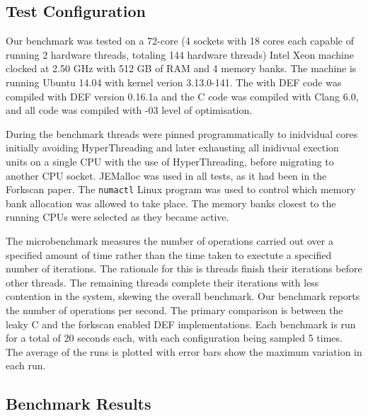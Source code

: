 \subsection{Test Configuration}

Our benchmark was tested on a 72-core (4 sockets with 18 cores each capable of running 2 hardware threads, totaling 144 hardware threads) Intel Xeon machine clocked at 2.50 GHz with 512 GB of RAM and 4 memory banks. The machine is running Ubuntu 14.04 with kernel verion 3.13.0-141. The with DEF code was compiled with DEF version 0.16.1a and the C code was compiled with Clang 6.0, and all code was compiled with -03 level of optimisation.

During the benchmark threads were pinned programmatically to inidvidual cores initially avoiding HyperThreading and later exhausting all inidivual exection units on a single CPU with the use of HyperThreading, before migrating to another CPU socket. JEMalloc\cite{JEMalloc} was used in all tests, as it had been in the Forkscan paper.\cite{Forkscan} The \texttt{numactl} Linux program was used to control which memory bank allocation was allowed to take place. The memory banks closest to the running CPUs were selected as they became active.

The microbenchmark measures the number of operations carried out over a specified amount of time rather than the time taken to exectute a specified number of iterations. The rationale for this is threads finish their iterations before other threads. The remaining threads complete their iterations with less contention in the system, skewing the overall benchmark. Our benchmark reports the number of operations per second. The primary comparison is between the leaky C and the forkscan enabled DEF implementations. Each benchmark is run for a total of 20 seconds each, with each configuration being sampled 5 times. The average of the runs is plotted with error bars show the maximum variation in each run.

\subsection{Benchmark Results}

